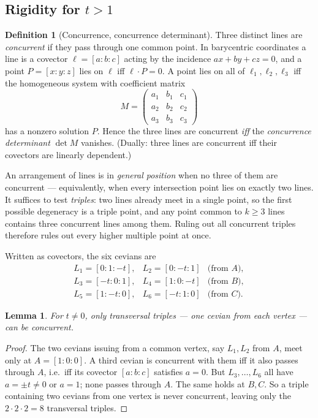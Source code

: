 \documentclass[11pt,a4paper,reqno]{amsart}
\newtheorem{lemma}[theorem]{Lemma}
\theoremstyle{definition}
\newtheorem{definition}[theorem]{Definition}
\theoremstyle{remark}
\begin{document}
\subsection{Rigidity for $t>1$}\label{sec:rigid}
\begin{definition}[Concurrence, concurrence determinant]
Three distinct lines are \emph{concurrent} if they pass through one common point. In barycentric coordinates a
line is a covector $\ell=[a:b:c]$ acting by the incidence $ax+by+cz=0$, and a point $P=[x:y:z]$ lies on $\ell$ iff
$\ell\cdot P=0$. A point lies on all of $\ell_1,\ell_2,\ell_3$ iff the homogeneous system with coefficient matrix
\[
M=\begin{pmatrix} a_1&b_1&c_1\\ a_2&b_2&c_2\\ a_3&b_3&c_3\end{pmatrix}
\]
has a nonzero solution $P$. Hence the three lines are concurrent \emph{iff} the \emph{concurrence determinant}
$\det M$ vanishes. (Dually: three lines are concurrent iff their covectors are linearly dependent.)

An arrangement of lines is in \emph{general position} when no three of them are concurrent --- equivalently, when
every intersection point lies on exactly two lines. It suffices to test \emph{triples}: two lines already meet in
a single point, so the first possible degeneracy is a triple point, and any point common to $k\ge3$ lines contains
three concurrent lines among them. Ruling out all concurrent triples therefore rules out every higher multiple
point at once.
\end{definition}

Written as covectors, the six cevians are
\[
\begin{array}{lll}
L_1=[0:1:-t], & L_2=[0:-t:1] & \text{(from $A$)},\\
L_3=[-t:0:1], & L_4=[1:0:-t] & \text{(from $B$)},\\
L_5=[1:-t:0], & L_6=[-t:1:0] & \text{(from $C$)}.
\end{array}
\]

\begin{lemma}\label{lem:transversal}
For $t\neq0$, only \emph{transversal} triples --- one cevian from each vertex --- can be concurrent.
\end{lemma}
\begin{proof}
The two cevians issuing from a common vertex, say $L_1,L_2$ from $A$, meet only at $A=[1:0:0]$. A third cevian is
concurrent with them iff it also passes through $A$, i.e.\ iff its covector $[a:b:c]$ satisfies $a=0$. But
$L_3,\dots,L_6$ all have $a=\pm t\neq0$ or $a=1$; none passes through $A$. The same holds at $B,C$. So a triple
containing two cevians from one vertex is never concurrent, leaving only the $2\cdot2\cdot2=8$ transversal triples.
\end{proof}
\end{document}
